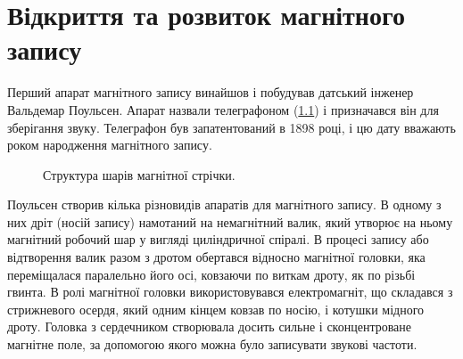 \documentclass[a4paper,14pt]{extreport}
\begin{document}
\newpage

\chapter{Відкриття та розвиток магнітного запису}\par

  Перший апарат магнітного запису винайшов і побудував датський інженер Вальдемар Поульсен. Апарат назвали телеграфоном (\ref{ris2}) і призначався він для
  зберігання звуку. Телеграфон був запатентований в 1898 році\cite{lit1}, і цю дату вважають роком народження магнітного запису.\par
    \begin{figure}[h]
    \caption{Структура шарів магнітної стрічки.}
    \label{ris2}
  \end{figure}
  Поульсен створив кілька різновидів апаратів для магнітного запису. В одному з них дріт (носій запису) намотаний на немагнітний валик, який утворює на ньому магнітний робочий шар у вигляді циліндричної спіралі. В процесі запису або відтворення валик разом з дротом
  обертався відносно магнітної головки, яка переміщалася паралельно його осі, ковзаючи по виткам дроту, як по різьбі гвинта. В ролі магнітної головки використовувався електромагніт, що складався з стрижневого осердя, який одним кінцем ковзав по носію, і
  котушки мідного дроту. Головка з сердечником створювала досить сильне і сконцентроване магнітне поле, за допомогою якого можна було записувати звукові частоти.\par
\end{document}
